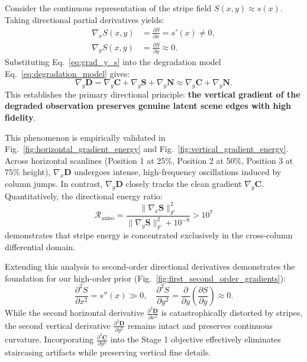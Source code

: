 Consider the continuous representation of the stripe field $S(x, y) \approx s(x)$. Taking directional partial derivatives yields:
\begin{align}
\nabla_x S(x, y) &= \frac{\partial S}{\partial x} = s'(x) \neq 0, \label{eq:grad_x_s} \\
\nabla_y S(x, y) &= \frac{\partial S}{\partial y} \approx 0. \label{eq:grad_y_s}
\end{align}
Substituting Eq.~\eqref{eq:grad_y_s} into the degradation model Eq.~\eqref{eq:degradation_model} gives:
\begin{equation}
\label{eq:grad_y_preservation}
\nabla_y \mathbf{D} = \nabla_y \mathbf{C} + \nabla_y \mathbf{S} + \nabla_y \mathbf{N} \approx \nabla_y \mathbf{C} + \nabla_y \mathbf{N}.
\end{equation}
This establishes the primary directional principle: \textbf{the vertical gradient of the degraded observation preserves genuine latent scene edges with high fidelity}.

This phenomenon is empirically validated in Fig.~\ref{fig:horizontal_gradient_energy} and Fig.~\ref{fig:vertical_gradient_energy}. Across horizontal scanlines (Position 1 at 25\%, Position 2 at 50\%, Position 3 at 75\% height), $\nabla_x \mathbf{D}$ undergoes intense, high-frequency oscillations induced by column jumps. In contrast, $\nabla_y \mathbf{D}$ closely tracks the clean gradient $\nabla_y \mathbf{C}$. Quantitatively, the directional energy ratio:
\begin{equation}
\mathcal{R}_{\mathrm{aniso}} = \frac{\|\nabla_x \mathbf{S}\|_F^2}{\|\nabla_y \mathbf{S}\|_F^2 + 10^{-8}} > 10^7
\end{equation}
demonstrates that stripe energy is concentrated exclusively in the cross-column differential domain.

Extending this analysis to second-order directional derivatives demonstrates the foundation for our high-order prior (Fig.~\ref{fig:first_second_order_gradients}):
\begin{equation}
\frac{\partial^2 S}{\partial x^2} = s''(x) \gg 0, \quad \frac{\partial^2 S}{\partial y^2} = \frac{\partial}{\partial y}\left(\frac{\partial S}{\partial y}\right) \approx 0.
\end{equation}
While the second horizontal derivative $\frac{\partial^2 \mathbf{D}}{\partial x^2}$ is catastrophically distorted by stripes, the second vertical derivative $\frac{\partial^2 \mathbf{D}}{\partial y^2}$ remains intact and preserves continuous curvature. Incorporating $\frac{\partial^2 \mathbf{C}}{\partial y^2}$ into the Stage 1 objective effectively eliminates staircasing artifacts while preserving vertical fine details.
